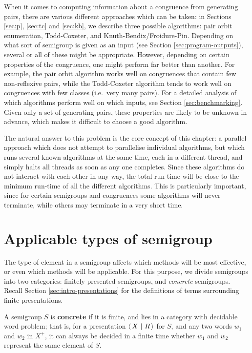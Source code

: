 When it comes to computing information about a congruence from generating pairs,
there are various different approaches which can be taken: in Sections
\ref{sec:p}, \ref{sec:tc} and \ref{sec:kb}, we describe three possible
algorithms: pair orbit enumeration, Todd-Coxeter, and Knuth-Bendix/Froidure-Pin.
Depending on what sort of semigroup is given as an input (see Section
\ref{sec:program-outputs}), several
or all of these might be appropriate.  However, depending on certain properties
of the congruence, one might perform far better than another.  For example, the
pair orbit algorithm works well on congruences that contain few non-reflexive
pairs, while the Todd-Coxeter algorithm tends to work well on congruences with
few classes (i.e.~very many pairs).  For a detailed analysis of which algorithms
perform well on which inputs, see Section \ref{sec:benchmarking}.  Given
only a set of generating pairs, these properties are likely to be unknown in
advance, which makes it difficult to choose a good algorithm.

The natural answer to this problem is the core concept of this chapter: a
parallel approach which does not attempt to parallelise individual algorithms,
but which runs several known algorithms at the same time, each in a different
thread, and simply halts all threads as soon as any one completes.  Since these
algorithms do not interact with each other in any way, the total run-time will
be close to the minimum run-time of all the different algorithms.  This is
particularly important, since for certain semigroups and congruences some
algorithms will never terminate, while others may terminate in a very short
time.

\section{Applicable types of semigroup}
\label{sec:applicable-types-of-semigroup}

The type of element in a semigroup affects which methods will be most effective,
or even which methods will be applicable.  For this purpose, we divide
semigroups into two categories: finitely presented semigroups, and
\textit{concrete} semigroups.  Recall Section \ref{sec:intro-presentations} for
the definitions of terms surrounding finite presentations.

\begin{definition}
  \label{def:concrete}
  A semigroup $S$ is \textbf{concrete} if it is finite, and lies in a category
  with decidable word problem; that is, for a presentation $\left\langle\,X ~\middle|~ R\,\right\rangle$ for $S$, and
  any two words $w_1$ and $w_2$ in $X^+$, it can always be decided in a finite
  time whether $w_1$ and $w_2$ represent the same element of $S$.
\end{definition}

